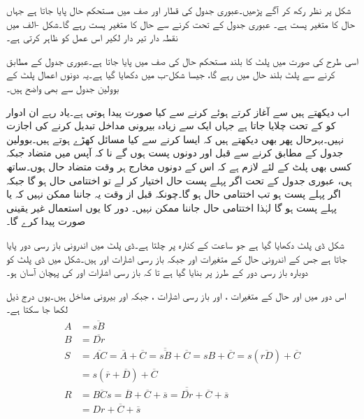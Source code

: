 شکل   پر نظر رکھ کر  آگے پڑھیں۔عبوری جدول  کی   قطار  اور    صف میں  مستحکم حال پایا جاتا ہے جہاں حال کا متغیر پست     ہے۔ عبوری جدول کے تحت    کرنے سے حال کا متغیر پست رہے گا۔شکل -الف میں    نقطہ دار تیر   دار لکیر اس عمل کو ظاہر کرتی ہے۔

اسی طرح    کی صورت میں پلٹ کا  بلند  مستحکم حال    کی صف میں پایا جاتا ہے۔عبوری جدول کے مطابق   کرنے سے  پلٹ بلند حال میں رہے  گا، جیسا  شکل-ب میں دکھایا گیا ہے۔یہ دونوں اعمال پلٹ کے بوولین جدول سے بھی واضح ہیں۔

اب دیکھتے ہیں    سے آغاز کرتے ہوئے   کرنے سے کیا صورت پیدا ہوتی ہے۔یاد رہے ان  ادوار کو کے تحت  چلایا جاتا ہے جہاں ایک سے زیادہ بیرونی مداخل تبدیل کرنے کی اجازت نہیں۔بہرحال پھر بھی دیکھتے ہیں کہ ایسا کرنے سے کیا مسائل کھڑے ہوتے ہیں۔بوولین جدول کے مطابق   کرنے سے قبل   اور  دونوں  پست ہوں گے نا کہ  آپس میں متضاد   جبکہ کسی بھی پلٹ کے لئے  لازم ہے کہ اس کے دونوں مخارج ہر وقت متضاد حال ہوں۔ساتھ ہی،  عبوری جدول کے تحت  اگر پہلے پست حال اختیار کر لے تو اختتامی حال     ہو گا جبکہ اگر    پہلے  پست ہو  تب اختتامی حال   ہو گا۔چونکہ قبل از وقت یہ جاننا ممکن نہیں کہ  یا  پہلے پست ہو گا لہٰذا  اختتامی حال جاننا ممکن نہیں۔  دور کا  یوں استعمال غیر یقینی صورت پیدا کرے گا۔


شکل   ڈی  پلٹ دکھایا گیا ہے جو  ساعت کے کنارہ  پر چلتا  ہے۔ڈی پلٹ میں اندرونی باز رسی دور پایا جاتا ہے جس کے اندرونی حال کے متغیرات   اور   جبکہ باز رسی اشارات   اور  ہیں۔شکل میں  ڈی پلٹ  کو دوبارہ باز رسی دور کے طرز پر بنایا گیا ہے تا کہ باز رسی اشارات   اور  کی پہچان آسان ہو۔

اس دور  میں  اور  حال کے متغیرات ،  اور  باز رسی اشارات  ، جبکہ   اور  بیرونی مداخل ہیں۔یوں  درج ذیل  لکھا جا سکتا ہے۔
\begin{gather}
\begin{aligned}
A&=\overline{sB}\\
B&=\overline{Dr}\\
S&=\overline{AC}=\overline{A}+\overline{C}=\overline{\overline{sB}}+\overline{C}=sB+\overline{C}=s(\overline{rD})+\overline{C}\\
&=s(\overline{r}+\overline{D})+\overline{C}\\
R&=\overline{BCs}=\overline{B}+\overline{C}+\overline{s}=\overline{\overline{Dr}}+\overline{C}+\overline{s}\\
&=Dr+\overline{C}+\overline{s}
\end{aligned}
\end{gather}


